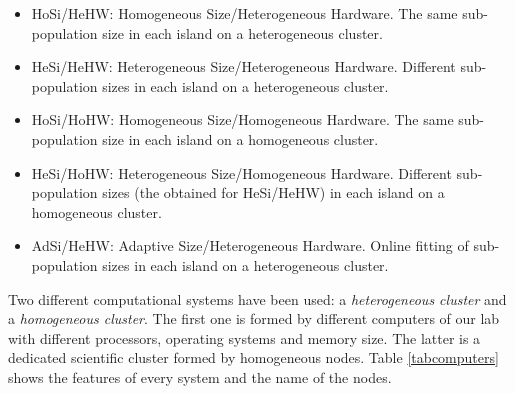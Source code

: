 \documentclass[final,1p,times]{elsarticle}
\begin{document}
\begin{itemize}
\item HoSi/HeHW: Homogeneous Size/Heterogeneous Hardware. The same sub-population size in each island on a heterogeneous cluster.
\item HeSi/HeHW: Heterogeneous Size/Heterogeneous Hardware. Different sub-population sizes in each island on a heterogeneous cluster.
\item HoSi/HoHW: Homogeneous Size/Homogeneous Hardware. The same sub-population size in each island on a homogeneous cluster.
\item HeSi/HoHW: Heterogeneous Size/Homogeneous Hardware. Different sub-population sizes (the obtained for HeSi/HeHW) in each island on a homogeneous cluster.

\item AdSi/HeHW: Adaptive Size/Heterogeneous Hardware. Online fitting of sub-population sizes in each island on a heterogeneous cluster.
\end{itemize}

Two different computational systems have been used: a {\em heterogeneous cluster} and a {\em homogeneous cluster}. The first one is formed by different computers of our lab with different processors, operating systems and memory size. The latter is a dedicated scientific cluster formed by homogeneous nodes. Table \ref{tabcomputers} shows the features of every system and the name of the nodes.
\end{document}
